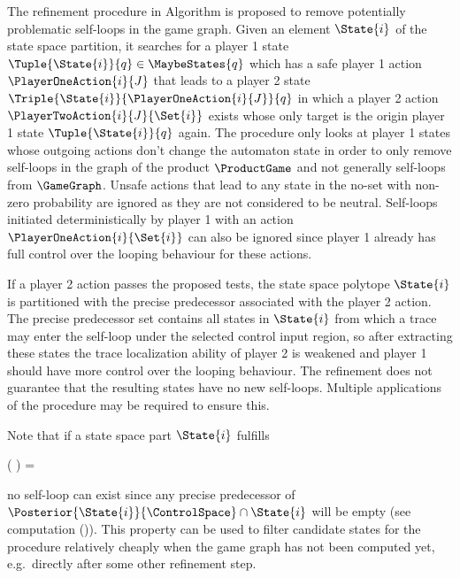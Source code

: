     The refinement procedure in Algorithm  is proposed to remove potentially problematic self-loops in the game graph.
    Given an element $\State{i}$ of the state space partition, it searches for a player 1 state $\Tuple{\State{i}}{q} \in \MaybeStates{q}$ which has a safe player 1 action $\PlayerOneAction{i}{J}$ that leads to a player 2 state $\Triple{\State{i}}{\PlayerOneAction{i}{J}}{q}$ in which a player 2 action $\PlayerTwoAction{i}{J}{\Set{i}}$ exists whose only target is the origin player 1 state $\Tuple{\State{i}}{q}$ again.
    The procedure only looks at player 1 states whose outgoing actions don't change the automaton state in order to only remove self-loops in the graph of the product $\ProductGame$ and not generally self-loops from $\GameGraph$.
    Unsafe actions that lead to any state in the no-set with non-zero probability are ignored as they are not considered to be neutral.
    Self-loops initiated deterministically by player 1 with an action $\PlayerOneAction{i}{\Set{i}}$ can also be ignored since player 1 already has full control over the looping behaviour for these actions.

    If a player 2 action passes the proposed tests, the state space polytope $\State{i}$ is partitioned with the precise predecessor associated with the player 2 action.
    The precise predecessor set contains all states in $\State{i}$ from which a trace may enter the self-loop under the selected control input region, so after extracting these states the trace localization ability of player 2 is weakened and player 1 should have more control over the looping behaviour.
    The refinement does not guarantee that the resulting states have no new self-loops.
    Multiple applications of the procedure may be required to ensure this.

    Note that if a state space part $\State{i}$ fulfills

    \startformula
        ( \cap {}) \ominus \RandomSpace = \emptyset \EndComma
    \stopformula

    no self-loop can exist since any precise predecessor of $\Posterior{\State{i}}{\ControlSpace} \cap \State{i}$ will be empty (see computation (\in[TODO])).
    This property can be used to filter candidate states for the procedure relatively cheaply when the game graph has not been computed yet, e.g.\ directly after some other refinement step.

\stopsubsection

